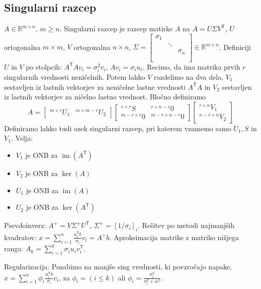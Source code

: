 \documentclass[a4paper,10pt]{article}
\theoremstyle{definition}
\def\R{\mathbb{R}}
\newcommand{\T}{\mathsf{T}\!}
\DeclareMathOperator{\im}{im}
\begin{document}
\subsection*{Singularni razcep}
$A \in \R^{m\times n}$, $m \geq n$. Singularni razcep je razcep matirke $A$ na
$A = U \Sigma V^\T$, $U$ ortogonalna $m\times m$, $V$ ortogonalna $n\times n$,
$\Sigma =
\begin{bmatrix}
  \sigma_1 && \\
  & \ddots & \\
  && \sigma_n \\
  && \\
\end{bmatrix} \in \R^{m\times n}$. Definiciji $U$ in $V$ po stolpcih: $A^\T A v_i = \sigma_i^2 v_i$, $Av_i =
\sigma_iu_i$.
Recimo, da ima matrika prvih $r$ singularnih vrednosti neničelnih. Potem lahko
$V$ razdelimo na dva dela, $V_1$ sestavljen iz lastnih vektorjev za neničelne
lastne vrednosti $A^\T A$ in $V_2$ sestavljen iz lastnih vektorjev za ničelno
lastno vrednost. Bločno definiramo
\[ A =
  \begin{bmatrix}
    ^{m\times r} U_1 & ^{m\times m-r}U_2
  \end{bmatrix}
  \begin{bmatrix}
    ^{r\times r} S & ^{r \times n-r}0 \\
    ^{m-r \times r}0 & ^{m-r\times n-r} 0
  \end{bmatrix}
  \begin{bmatrix}
    ^{r \times n} V_1 \\ ^{n-r \times n}V_2
  \end{bmatrix}
\]
Definiramo lahko tudi ozek singularni razcep, pri katerem vzamemo samo $U_1, S$
in $V_1$. Velja: \vspace{-2ex}
\begin{itemize}
  \item $V_1$ je ONB za $\im(A^\T)$
  \item $V_2$ je ONB za $\ker(A)$
  \item $U_1$ je ONB za $\im(A)$
  \item $U_2$ je ONB za $\ker(A^\T)$
\end{itemize}
Psevdoinverz: $A^+ = V\Sigma^+ U^\T$, $\Sigma^+ = [1/\sigma_i]_i$.
Rešitev po metodi najmanjših kvadratov: $x = \sum_{i=1}^n\frac{u_i^\T
b}{\sigma_i}v_i = A^+b$.
Aproksimacija matrike z matriko nižjega ranga:
$A_k = \sum_{i=1}^k \sigma_i u_i v_i^\T$.

Regularizacija: Pozabimo na manjše sing vrednosti, ki povzročajo napake.
$x = \sum_{i=1}^n \phi_i \frac{u_i^\T b}{\sigma_i}v_i$, za
$\phi_i = (i \leq k)$ ali $\phi_i = \frac{\sigma_i^2}{\sigma_i^2 +
\alpha^2}$.
\end{document}

